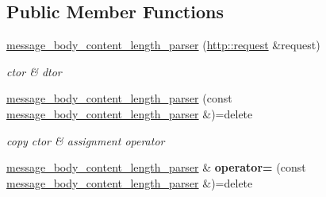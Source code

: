 \subsection*{Public Member Functions}
\begin{DoxyCompactItemize}
\item 
\mbox{\label{classnetflex_1_1parsing_1_1message__body__content__length__parser_a639fe3f1644ba35c46cdcb4de6973aee}} 
\hyperlink{classnetflex_1_1parsing_1_1message__body__content__length__parser_a639fe3f1644ba35c46cdcb4de6973aee}{message\+\_\+body\+\_\+content\+\_\+length\+\_\+parser} (\hyperlink{classnetflex_1_1http_1_1request}{http\+::request} \&request)
\begin{DoxyCompactList}\small\item\em ctor \& dtor \end{DoxyCompactList}\item 
\mbox{\label{classnetflex_1_1parsing_1_1message__body__content__length__parser_ab273008d20c057036ea27c81e728f155}} 
\hyperlink{classnetflex_1_1parsing_1_1message__body__content__length__parser_ab273008d20c057036ea27c81e728f155}{message\+\_\+body\+\_\+content\+\_\+length\+\_\+parser} (const \hyperlink{classnetflex_1_1parsing_1_1message__body__content__length__parser}{message\+\_\+body\+\_\+content\+\_\+length\+\_\+parser} \&)=delete
\begin{DoxyCompactList}\small\item\em copy ctor \& assignment operator \end{DoxyCompactList}\item 
\mbox{\label{classnetflex_1_1parsing_1_1message__body__content__length__parser_aa186661021a3432bfd349f34398cf5db}} 
\hyperlink{classnetflex_1_1parsing_1_1message__body__content__length__parser}{message\+\_\+body\+\_\+content\+\_\+length\+\_\+parser} \& {\bfseries operator=} (const \hyperlink{classnetflex_1_1parsing_1_1message__body__content__length__parser}{message\+\_\+body\+\_\+content\+\_\+length\+\_\+parser} \&)=delete
\item 
\mbox{\label{classnetflex_1_1parsing_1_1message__body__content__length__parser_a57265653361c2c29919799e2a7346a48}} 

\end{DoxyCompactItemize}
